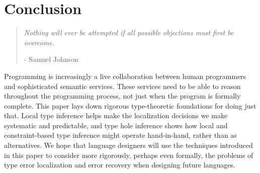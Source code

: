\section{Conclusion}
\label{sec:conclusion}

\begin{quote}
    \emph{Nothing will ever be attempted if all possible objections must first be overcome.} 
    \begin{flushright}- Samuel Johnson\end{flushright}
\end{quote}

Programming is increasingly a live collaboration between human programmers and sophisticated semantic services. 
These services need to be able to reason throughout the programming process, not just when the program is formally complete. This paper lays down rigorous type-theoretic foundations for doing just that. Local type inference helps make the localization decisions we make systematic and predictable, and type hole inference shows how local and constraint-based type inference might operate hand-in-hand, rather than as alternatives. 
We hope that language designers will use the techniques introduced in this paper to consider more rigorously, perhaps even formally, the problems of type error localization and error recovery when designing future languages. 